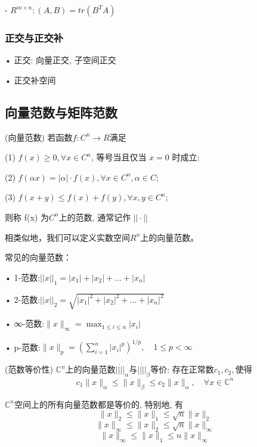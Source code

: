 \documentclass[12pt,a4paper]{article}
\begin{document}
\qquad - $R^{m×n} : (A, B) = tr(B^{T}A)$

\subsubsection{正交与正交补}

• 正交: 向量正交, 子空间正交

• 正交补空间

\subsection{向量范数与矩阵范数}
\begin{framed}
\begin{definition}(向量范数)
	若函数$f : C^n → R $满足
	
	(1) $f(x) ≥ 0, ∀ x ∈ C^n$, 等号当且仅当 $x = 0$ 时成立;
	
	(2) $f(αx) = |α| · f(x), ∀ x ∈ C^{n}, α ∈ C;$
	
	(3) $f(x + y) ≤ f(x) + f(y), ∀x, y ∈ C^{n};$
	
	则称 f(x) 为$C^{n}$上的范数, 通常记作 $||·||$
\end{definition}
\end{framed}
相类似地，我们可以定义实数空间$R^n$上的向量范数。

常见的向量范数：

• 1-范数:$||x||_1=|x_1|+|x_2|+...+|x_n|$

• 2-范数:$||x||_2=\sqrt{|x_1|^2+|x_2|^2+...+|x_n|^2}$
 
• ∞-范数:$\|x\|_{\infty}=\max _{1 \leq i \leq n}\left|x_{i}\right|$

• p-范数:$\|x\|_{p}=\left(\sum_{i=1}^{n}\left|x_{i}\right|^{p}\right)^{1 / p}, \quad 1 \leq p<\infty$

\begin{framed}
	\begin{definition}(范数等价性)
		$\mathbb{C}^{n}$上的向量范数$||\dot||_{\alpha}$与$||\dot||_{\beta}$等价: 存在正常数$c_1, c_2,$使得
		$$c_{1}\|x\|_{\alpha} \leq\|x\|_{\beta} \leq c_{2}\|x\|_{\alpha}, \quad \forall x \in \mathbb{C}^{n}$$
	\end{definition}
\end{framed}

\begin{framed}
	\begin{theorem}
$\mathbb{C}^{n}$空间上的所有向量范数都是等价的, 特别地, 有
	$$
	\|x\|_{2} \leq\|x\|_{1} \leq \sqrt{n}\|x\|_{2}
	$$
	$$
	\|x\|_{\infty} \leq\|x\|_{2} \leq \sqrt{n}\|x\|_{\infty}
	$$
	$$
	\|x\|_{\infty} \leq\|x\|_{1} \leq n\|x\|_{\infty}
	$$
	\end{theorem}
\end{framed}
\end{document}
